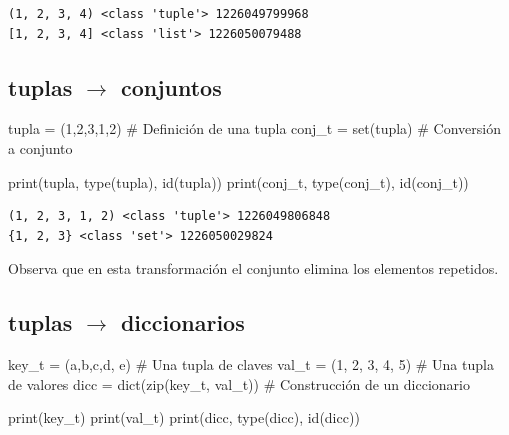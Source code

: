 \documentclass[
  spanish,
  letterpaper,
]{scrbook}
\newenvironment{Shaded}{\begin{snugshade}}{\end{snugshade}}
\newcommand{\BuiltInTok}[1]{\textcolor[rgb]{0.00,0.23,0.31}{#1}}
\newcommand{\CommentTok}[1]{\textcolor[rgb]{0.37,0.37,0.37}{#1}}
\newcommand{\DecValTok}[1]{\textcolor[rgb]{0.68,0.00,0.00}{#1}}
\newcommand{\NormalTok}[1]{\textcolor[rgb]{0.00,0.23,0.31}{#1}}
\newcommand{\OperatorTok}[1]{\textcolor[rgb]{0.37,0.37,0.37}{#1}}
\newcommand{\StringTok}[1]{\textcolor[rgb]{0.13,0.47,0.30}{#1}}
\theoremstyle{definition}
\theoremstyle{remark}
\begin{document}
\begin{verbatim}
(1, 2, 3, 4) <class 'tuple'> 1226049799968
[1, 2, 3, 4] <class 'list'> 1226050079488
\end{verbatim}

\subsection{\texorpdfstring{tuplas \(\to\)
conjuntos}{tuplas \textbackslash to conjuntos}}\label{tuplas-to-conjuntos}

\begin{Shaded}
\begin{Highlighting}[]
\NormalTok{tupla }\OperatorTok{=}\NormalTok{ (}\DecValTok{1}\NormalTok{,}\DecValTok{2}\NormalTok{,}\DecValTok{3}\NormalTok{,}\DecValTok{1}\NormalTok{,}\DecValTok{2}\NormalTok{) }\CommentTok{\# Definición de una tupla}
\NormalTok{conj\_t }\OperatorTok{=} \BuiltInTok{set}\NormalTok{(tupla) }\CommentTok{\# Conversión a conjunto}

\BuiltInTok{print}\NormalTok{(tupla, }\BuiltInTok{type}\NormalTok{(tupla), }\BuiltInTok{id}\NormalTok{(tupla))}
\BuiltInTok{print}\NormalTok{(conj\_t, }\BuiltInTok{type}\NormalTok{(conj\_t), }\BuiltInTok{id}\NormalTok{(conj\_t))}
\end{Highlighting}
\end{Shaded}

\begin{verbatim}
(1, 2, 3, 1, 2) <class 'tuple'> 1226049806848
{1, 2, 3} <class 'set'> 1226050029824
\end{verbatim}

Observa que en esta transformación el conjunto elimina los elementos
repetidos.

\subsection{\texorpdfstring{tuplas \(\to\)
diccionarios}{tuplas \textbackslash to diccionarios}}\label{tuplas-to-diccionarios}

\begin{Shaded}
\begin{Highlighting}[]
\NormalTok{key\_t }\OperatorTok{=}\NormalTok{ (}\StringTok{\textquotesingle{}a\textquotesingle{}}\NormalTok{,}\StringTok{\textquotesingle{}b\textquotesingle{}}\NormalTok{,}\StringTok{\textquotesingle{}c\textquotesingle{}}\NormalTok{,}\StringTok{\textquotesingle{}d\textquotesingle{}}\NormalTok{, }\StringTok{\textquotesingle{}e\textquotesingle{}}\NormalTok{) }\CommentTok{\# Una tupla de claves}
\NormalTok{val\_t }\OperatorTok{=}\NormalTok{ (}\DecValTok{1}\NormalTok{, }\DecValTok{2}\NormalTok{, }\DecValTok{3}\NormalTok{, }\DecValTok{4}\NormalTok{, }\DecValTok{5}\NormalTok{)        }\CommentTok{\# Una tupla de valores}
\NormalTok{dicc }\OperatorTok{=} \BuiltInTok{dict}\NormalTok{(}\BuiltInTok{zip}\NormalTok{(key\_t, val\_t)) }\CommentTok{\# Construcción de un diccionario}

\BuiltInTok{print}\NormalTok{(key\_t)}
\BuiltInTok{print}\NormalTok{(val\_t)}
\BuiltInTok{print}\NormalTok{(dicc, }\BuiltInTok{type}\NormalTok{(dicc), }\BuiltInTok{id}\NormalTok{(dicc))}
\end{Highlighting}
\end{Shaded}
\end{document}

